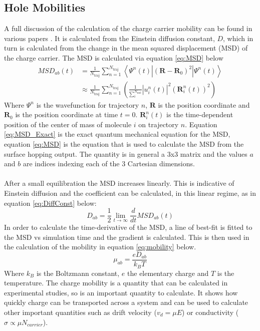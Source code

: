 \subsection{Hole Mobilities}
\label{sect:mobilities}
A full discussion of the calculation of the charge carrier mobility can be found in various papers \cite{Carof17FSSH,Giannini2018Crossover,Giannini2019}. It is calculated from the Einstein diffusion constant, $D$, which in turn is calculated from the change in the mean squared displacement (MSD) of the charge carrier. The MSD is calculated via equation \eqref{eq:MSD} below
\begin{eqnarray}
  \label{eq:MSD_Exact}
  MSD_{ab}(t) &= \frac{1}{N_{\text{traj}}} \sum_{n=1}^{N_{\text{traj}}} \left\langle \Psi^{n}(t) | (\mathbf{R} - \mathbf{R}_{0})^2 | \Psi^{n}(t) \right\rangle \\
  &\approx \frac{1}{N_{\text{traj}}} \sum_{n=1}^{N_{\text{traj}}} \left(\frac{1}{\sum_{i}^{N_{\text{mol}}}} \left| u^{n}_{i}(t) \right|^2 (\mathbf{R}_{i}^{n}(t))^2 \right)
  \label{eq:MSD}
\end{eqnarray}
Where $\Psi^{n}$ is the wavefunction for trajectory $n$, $\mathbf{R}$ is the position coordinate and $\mathbf{R}_{0}$ is the position coordinate at time $t=0$. $\mathbf{R}_{i}^{n}(t)$ is the time-dependent position of the center of mass of molecule $i$ on trajectory $n$. Equation \eqref{eq:MSD_Exact} is the exact quantum mechanical equation for the MSD, equation \eqref{eq:MSD} is the equation that is used to calculate the MSD from the surface hopping output. The quantity is in general a 3x3 matrix and the values $a$ and $b$ are indices indexing each of the 3 Cartesian dimensions.
\\\\
After a small equilibration the MSD increases linearly. This is indicative of Einstein diffusion and the coefficient can be calculated, in this linear regime, as in equation \eqref{eq:DiffConst} below:
\begin{equation}
  D_{ab} = \frac{1}{2} \lim_{t \rightarrow \infty} \frac{d}{dt}MSD_{ab}(t)
  \label{eq:DiffConst}
\end{equation}
In order to calculate the time-derivative of the MSD, a line of best-fit is fitted to the MSD vs simulation time and the gradient is calculated. This is then used in the calculation of the mobility in equation \eqref{eq:mobility} below.
\begin{equation}
	\mu_{ab} = \frac{e D_{ab}}{k_{B} T}
	\label{eq:mobility}
\end{equation}
Where $k_{B}$ is the Boltzmann constant, $e$ the elementary charge and $T$ is the temperature. The charge mobility is a quantity that can be calculated in experimental studies, so is an important quantity to calculate. It shows how quickly charge can be transported across a system and can be used to calculate other important quantities such as drift velocity ($v_{d} = \mu E$) or conductivity ($\sigma \propto \mu N_{carrier}$).
